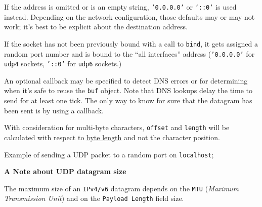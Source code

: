 If the address is omitted or is an empty string, \texttt{'0.0.0.0'} or
\texttt{'::0'} is used instead. Depending on the network configuration,
those defaults may or may not work; it's best to be explicit about the
destination address.

If the socket has not been previously bound with a call to
\texttt{bind}, it gets assigned a random port number and is bound to the
``all interfaces'' address (\texttt{'0.0.0.0'} for \texttt{udp4}
sockets, \texttt{'::0'} for \texttt{udp6} sockets.)

An optional callback may be specified to detect DNS errors or for
determining when it's safe to reuse the \texttt{buf} object. Note that
DNS lookups delay the time to send for at least one tick. The only way
to know for sure that the datagram has been sent is by using a callback.

With consideration for multi-byte characters, \texttt{offset} and
\texttt{length} will be calculated with respect to
\href{buffer.html\#buffer_class_method_buffer_bytelength_string_encoding}{byte
length} and not the character position.

Example of sending a UDP packet to a random port on \texttt{localhost};

\begin{Shaded}
\begin{Highlighting}[]
 \NormalTok{(}\NormalTok{);}
  \NormalTok{(}\NormalTok{);}
 \NormalTok{(}\NormalTok{);}
\NormalTok{, }\NormalTok{, }\NormalTok{, }\NormalTok{, }
  \NormalTok{();}
\NormalTok{\});}
\end{Highlighting}
\end{Shaded}

\textbf{A Note about UDP datagram size}

The maximum size of an \texttt{IPv4/v6} datagram depends on the
\texttt{MTU} (\emph{Maximum Transmission Unit}) and on the
\texttt{Payload Length} field size.

